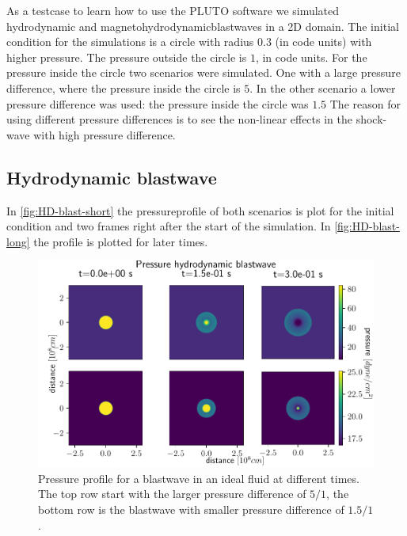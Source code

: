 As a testcase to learn how to use the PLUTO software we simulated hydrodynamic and magnetohydrodynamicblastwaves in a 2D domain. The initial condition for the simulations is a circle with radius $0.3$ (in code units) with higher pressure.
The pressure outside the circle is $1$, in code units. For the pressure inside the circle two scenarios were simulated.
One with a large pressure difference, where the pressure inside the circle is $5$. In the other scenario a lower pressure difference was used: the pressure inside the circle was $1.5$
The reason for using different pressure differences is to see the non-linear effects in the shock-wave with high pressure difference.

\subsection{Hydrodynamic blastwave}
In \autoref{fig:HD-blast-short} the pressureprofile of both scenarios is plot for the initial condition and two frames right after the start of the simulation.
In \autoref{fig:HD-blast-long} the profile is plotted for later times.

\begin{figure}[h]
	\centering
	\includegraphics[width=\linewidth]{images/HD-blast-prs-1.pdf}
	\caption{Pressure profile for a blastwave in an ideal fluid at different times. The top row start with the larger pressure difference of $5/1$, the bottom row is the blastwave with smaller pressure difference of $1.5/1$.}
	\label{fig:HD-blast-short}
\end{figure}

